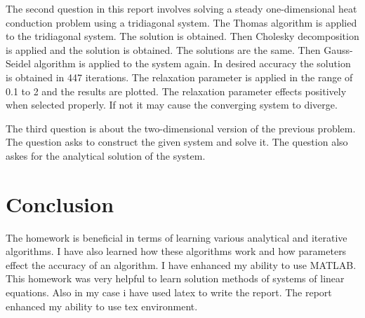 \documentclass[12pt, a4paper]{article}
\begin{document}
The second question in this report involves solving a steady one-dimensional heat conduction problem using a tridiagonal system. The Thomas algorithm is applied to the tridiagonal system. The solution is obtained. Then Cholesky decomposition is applied and the solution is obtained. The solutions are the same. Then Gauss-Seidel algorithm is applied to the system again. In desired accuracy the solution is obtained in 447 iterations. The relaxation parameter is applied in the range of 0.1 to 2 and the results are plotted. The relaxation parameter effects positively when selected properly. If not it may cause the converging system to diverge. 

The third question is about the two-dimensional version of the previous problem. The question asks to construct the given system and solve it. The question also askes for the analytical solution of the system.

\section{Conclusion}

The homework is beneficial in terms of learning various analytical and iterative algorithms. I have also learned how these algorithms work and how parameters effect the accuracy of an algorithm. I have enhanced my ability to use MATLAB. This homework was very helpful to learn solution methods of systems of linear equations. Also in my case i have used latex to write the report. The report enhanced my ability to use tex environment.
\end{document}
